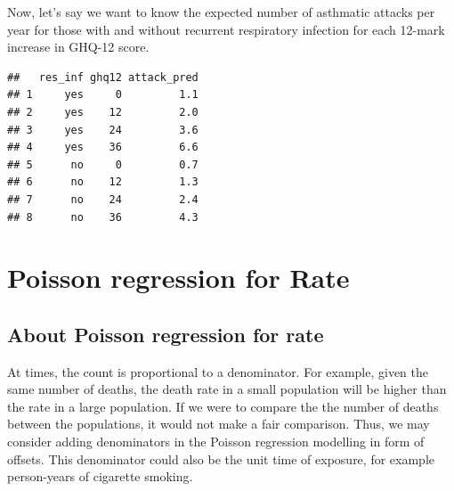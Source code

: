 \documentclass[
  10pt,
]{krantz}
\newenvironment{Shaded}{\begin{snugshade}}{\end{snugshade}}
\newcommand{\AttributeTok}[1]{\textcolor[rgb]{0.77,0.63,0.00}{#1}}
\newcommand{\DecValTok}[1]{\textcolor[rgb]{0.00,0.00,0.81}{#1}}
\newcommand{\FunctionTok}[1]{\textcolor[rgb]{0.00,0.00,0.00}{#1}}
\newcommand{\NormalTok}[1]{#1}
\newcommand{\OtherTok}[1]{\textcolor[rgb]{0.56,0.35,0.01}{#1}}
\newcommand{\SpecialCharTok}[1]{\textcolor[rgb]{0.00,0.00,0.00}{#1}}
\newcommand{\StringTok}[1]{\textcolor[rgb]{0.31,0.60,0.02}{#1}}
\begin{document}
Now, let's say we want to know the expected number of asthmatic attacks per year for those with and without recurrent respiratory infection for each 12-mark increase in GHQ-12 score.

\begin{Shaded}
\end{Shaded}

\begin{verbatim}
##   res_inf ghq12 attack_pred
## 1     yes     0         1.1
## 2     yes    12         2.0
## 3     yes    24         3.6
## 4     yes    36         6.6
## 5      no     0         0.7
## 6      no    12         1.3
## 7      no    24         2.4
## 8      no    36         4.3
\end{verbatim}

\hypertarget{poisson-regression-for-rate}{%
\section{\texorpdfstring{Poisson regression for Rate}{Poisson regression for Rate}}\label{poisson-regression-for-rate}}

\hypertarget{about-poisson-regression-for-rate}{%
\subsection{\texorpdfstring{About Poisson regression for rate}{About Poisson regression for rate}}\label{about-poisson-regression-for-rate}}

At times, the count is proportional to a denominator. For example, given the same number of deaths, the death rate in a small population will be higher than the rate in a large population. If we were to compare the the number of deaths between the populations, it would not make a fair comparison. Thus, we may consider adding denominators in the Poisson regression modelling in form of offsets. This denominator could also be the unit time of exposure, for example person-years of cigarette smoking.
\end{document}
